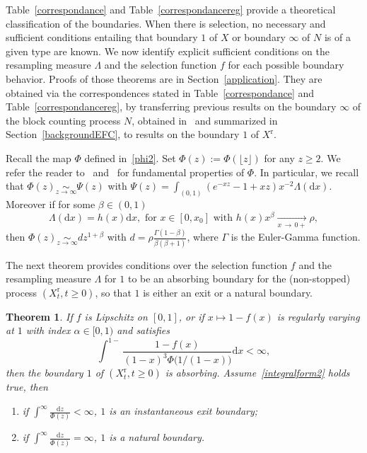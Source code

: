 \documentclass[10pt]{amsart}
\newtheorem{theo}{Theorem}[section]
\theoremstyle{definition}\newtheorem{defi}[theo]{Definition}\newtheorem{rema}[theo]{Remark}\newtheorem{exam}[theo]{Example}\newtheorem{exem}[theo]{Example}\newtheorem{nota}[theo]{Notation}
\newcommand{\ddr}{\mathrm{d}}
\newcommand{\rmr}{\mathrm{r}}
\newcommand*{\romanenumi}{\renewcommand*{\theenumi}{\roman{enumi}}}
\begin{document}
Table~\ref{correspondance} and Table~\ref{correspondancereg} provide a theoretical classification of the boundaries. When there is selection, no necessary and sufficient conditions entailing that boundary $1$ of $X$ or boundary $\infty$ of $N$ is of a given type are known. We now identify explicit sufficient conditions on the resampling measure $\Lambda$ and the selection function $f$ for each possible boundary behavior. Proofs of those theorems are in Section~\ref{application}. They are obtained via the correspondences stated in Table~\ref{correspondance} and Table~\ref{correspondancereg}, by transferring previous results on the boundary $\infty$ of the block counting process $N$, obtained in~\cite{explosion} and summarized in Section~\ref{backgroundEFC}, to results on the boundary $1$ of $X^{\rmr}$.

Recall the map $\Phi$ defined in~\eqref{phi2}. Set $\Phi(z):=\Phi(\lfloor z \rfloor)$ for any $z\geq 2$. We refer the reader to~\cite[Section~2.2]{cdiEFC} and~\cite{limic2015} for fundamental properties of $\Phi$. In particular, we recall that $\Phi(z)\underset{z\rightarrow \infty}{\sim} \Psi(z)$ with $\Psi(z)=\int_{(0,1)}(e^{-xz}-1+xz)x^{-2}\Lambda(\ddr x)$. Moreover if for some $\beta \in (0,1)$
\begin{equation}\label{regularlambda}
\Lambda(\ddr x)=h(x)\ddr x,\text{ for } x\in [0,x_0] \text{ with } h(x)x^{\beta}\underset{x\,\rightarrow\, 0+}{\longrightarrow}\rho,
\end{equation}
then $\Phi(z)\underset{z\rightarrow \infty}{\sim} dz^{1+\beta}$ with $d=\rho\frac{\Gamma(1-\beta)}{\beta(\beta+1)}$, where $\Gamma$ is the Euler-Gamma function.

The next theorem provides conditions over the selection function $f$ and the resampling measure $\Lambda$ for $1$ to be an absorbing boundary for the (non-stopped) process $(X_t^{\rmr},t\geq 0)$, so that $1$ is either an exit or a natural boundary.

\begin{theo}\label{suffcondexitf}
If $f$ is Lipschitz on $[0,1]$, or if $x\mapsto 1-f(x)$ is regularly varying at $1$ with index $\alpha\in [0,1)$ and satisfies
\begin{equation}\label{integralform2}
\int^{1-}\frac{1-f(x)}{(1-x)^3\Phi\big(1/(1-x)\big)} \ddr x<\infty,
\end{equation}
then the boundary $1$ of $(X^{\rmr}_t,t\geq 0)$ is absorbing. Assume~\eqref{integralform2} holds true, then
\begin{enumerate}\romanenumi
\item\label{theo 2.11.i} if $\int^{\infty}\frac{\ddr z}{\Phi(z)}<\infty$, $1$ is an instantaneous exit boundary;
\item\label{theo 2.11.ii} if $\int^{\infty}\frac{\ddr z}{\Phi(z)}=\infty$, $1$ is a natural boundary.
\end{enumerate}
\end{theo}
\end{document}
